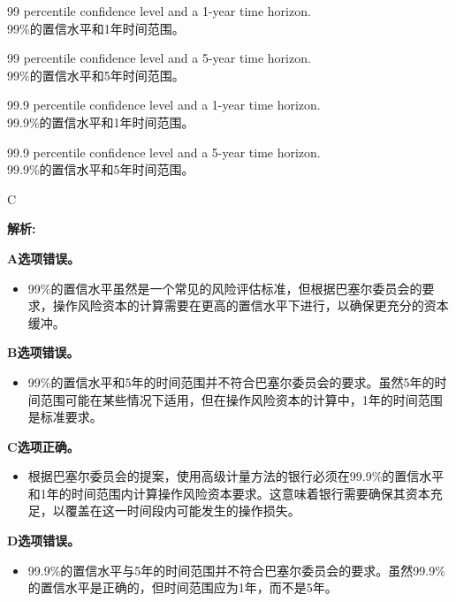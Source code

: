 \documentclass{article}
\newenvironment{explanation}
{\textbf{解析:}\par}
{\par}
\begin{document}
\begin{choices}
    \item 99 percentile confidence level and a 1-year time horizon.\\
    99\%的置信水平和1年时间范围。
    \item 99 percentile confidence level and a 5-year time horizon.\\
    99\%的置信水平和5年时间范围。
    \item 99.9 percentile confidence level and a 1-year time horizon.\\
    99.9\%的置信水平和1年时间范围。
    \item 99.9 percentile confidence level and a 5-year time horizon.\\
    99.9\%的置信水平和5年时间范围。
\end{choices}

\begin{correctanswer}
    C
\end{correctanswer}

\begin{explanation}
    \textbf{A选项错误。} 
    \begin{itemize}
        \item 99\%的置信水平虽然是一个常见的风险评估标准，但根据巴塞尔委员会的要求，操作风险资本的计算需要在更高的置信水平下进行，以确保更充分的资本缓冲。
    \end{itemize}

    \textbf{B选项错误。} 
    \begin{itemize}
        \item 99\%的置信水平和5年的时间范围并不符合巴塞尔委员会的要求。虽然5年的时间范围可能在某些情况下适用，但在操作风险资本的计算中，1年的时间范围是标准要求。
    \end{itemize}

    \textbf{C选项正确。} 
    \begin{itemize}
        \item 根据巴塞尔委员会的提案，使用高级计量方法的银行必须在99.9\%的置信水平和1年的时间范围内计算操作风险资本要求。这意味着银行需要确保其资本充足，以覆盖在这一时间段内可能发生的操作损失。
    \end{itemize}

    \textbf{D选项错误。} 
    \begin{itemize}
        \item 99.9\%的置信水平与5年的时间范围并不符合巴塞尔委员会的要求。虽然99.9\%的置信水平是正确的，但时间范围应为1年，而不是5年。
    \end{itemize}
\end{explanation}
\end{document}
